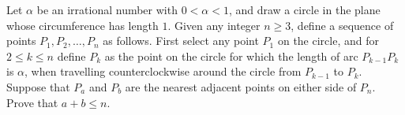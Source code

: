 Let $\alpha$ be an irrational number with $0<\alpha < 1$, and draw a circle in the plane whose circumference has length $1$. Given any integer $n\ge 3$, define a sequence of points $P_1, P_2, \ldots , P_n$ as follows. First select any point $P_1$ on the circle, and for $2\le k\le n$ define $P_k$ as the point on the circle for which the length of arc $P_{k-1}P_k$ is $\alpha$, when travelling counterclockwise around the circle from $P_{k-1}$ to $P_k$. Suppose that $P_a$ and $P_b$ are the nearest adjacent points on either side of $P_n$. Prove that $a+b\le n$.